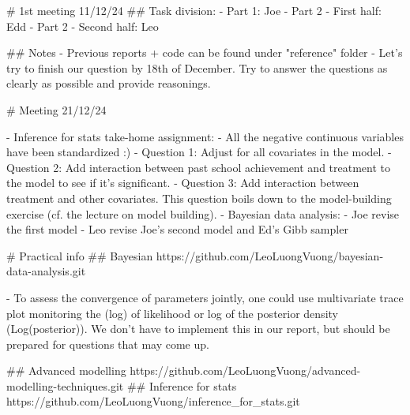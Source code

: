 \documentclass{article}
\begin{document}
\begin{markdown}
# 1st meeting 11/12/24
## Task division:
- Part 1: Joe
- Part 2 - First half: Edd
- Part 2 - Second half: Leo

## Notes
- Previous reports + code can be found under "reference" folder
- Let's try to finish our question by 18th of December. Try to answer the questions as clearly as possible and provide reasonings.

# Meeting 21/12/24

- Inference for stats take-home assignment:
  - All the negative continuous variables have been standardized :)
  - Question 1: Adjust for all covariates in the model.
  - Question 2: Add interaction between past school achievement and treatment to the model to see if it's significant.
  - Question 3: Add interaction between treatment and other covariates. This question boils down to the model-building exercise (cf. the lecture on model building).
- Bayesian data analysis:
  - Joe revise the first model 
  - Leo revise Joe's second model and Ed's Gibb sampler

# Practical info
## Bayesian
https://github.com/LeoLuongVuong/bayesian-data-analysis.git

- To assess the convergence of parameters jointly, one could use multivariate trace plot monitoring the (log) of likelihood or log of the posterior density (Log(posterior)). We don't have to implement this in our report, but should be prepared for questions that may come up. 

## Advanced modelling
https://github.com/LeoLuongVuong/advanced-modelling-techniques.git
## Inference for stats
https://github.com/LeoLuongVuong/inference_for_stats.git

\end{markdown}
\end{document}
